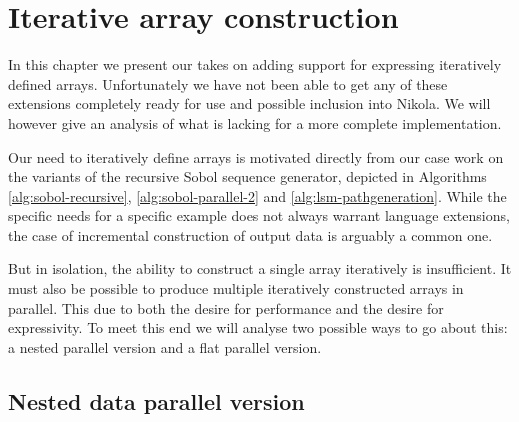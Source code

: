 \chapter{Iterative array construction}
\label{chap:unfold}


In this chapter we present our takes on adding support for expressing
iteratively defined arrays. Unfortunately we have not been able to get any of these
extensions completely ready for use and possible inclusion into Nikola.  We
will however give an analysis of what is lacking for a more complete
implementation.

Our need to iteratively define arrays is motivated directly from our case work
on the variants of the recursive Sobol sequence generator, depicted in
Algorithms \ref{alg:sobol-recursive}, \ref{alg:sobol-parallel-2} and
\ref{alg:lsm-pathgeneration}. While the specific needs for a specific example
does not always warrant language extensions, the case of incremental
construction of output data is arguably a common one.

But in isolation, the ability to construct a single array iteratively is
insufficient. It must also be possible to produce multiple iteratively
constructed arrays in parallel. This due to both the desire for performance and
the desire for expressivity. To meet this end we will analyse two possible ways
to go about this: a nested parallel version and a flat parallel version.

\section{Nested data parallel version}

